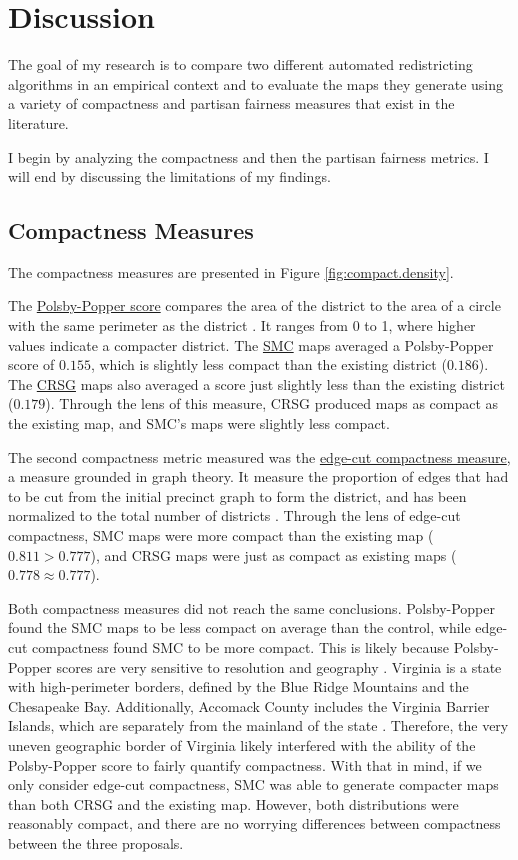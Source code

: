 \section{Discussion}
\label{sec:disc}

The goal of my research is to compare two different automated redistricting algorithms in an empirical context and to evaluate the maps they generate using a variety of compactness and partisan fairness measures that exist in the literature. 

I begin by analyzing the compactness and then the partisan fairness metrics. I will end by discussing the limitations of my findings. 

\subsection{Compactness Measures}

The compactness measures are presented in Figure \ref{fig:compact.density}. 

The \hyperref[sec:polsbypopper]{Polsby-Popper score} compares the area of the district to the area of a circle with the same perimeter as the district \parencite{polsby1991}. It ranges from 0 to 1, where higher values indicate a compacter district. The \hyperref[sec:smc]{SMC} maps averaged a Polsby-Popper score of $0.155$, which is slightly less compact than the existing district ($0.186$). The \hyperref[sec:crsg]{CRSG} maps also averaged a score just slightly less than the existing district ($0.179$). Through the lens of this measure, CRSG produced maps as compact as the existing map, and SMC's maps were slightly less compact. 

The second compactness metric measured was the \hyperref[sec:edgecut]{edge-cut compactness measure}, a measure grounded in graph theory. It measure the proportion of edges that had to be cut from the initial precinct graph to form the district, and has been normalized to the total number of districts \parencite{dube2016}. Through the lens of edge-cut compactness, SMC maps were more compact than the existing map ($0.811 > 0.777$), and CRSG maps were just as compact as existing maps ($0.778 \approx 0.777$). 

Both compactness measures did not reach the same conclusions. Polsby-Popper found the SMC maps to be less compact on average than the control, while edge-cut compactness found SMC to be more compact. This is likely because Polsby-Popper scores are very sensitive to resolution and geography \parencite{mccartan2020}. Virginia is a state with high-perimeter borders, defined by the Blue Ridge Mountains and the Chesapeake Bay. Additionally, Accomack County includes the Virginia Barrier Islands, which are separately from the mainland of the state \parencite{unitedstatesgeologicalsurvey2021}. Therefore, the very uneven geographic border of Virginia likely interfered with the ability of the Polsby-Popper score to fairly quantify compactness. With that in mind, if we only consider edge-cut compactness, SMC was able to generate compacter maps than both CRSG and the existing map. However, both distributions were reasonably compact, and there are no worrying differences between compactness between the three proposals. 


